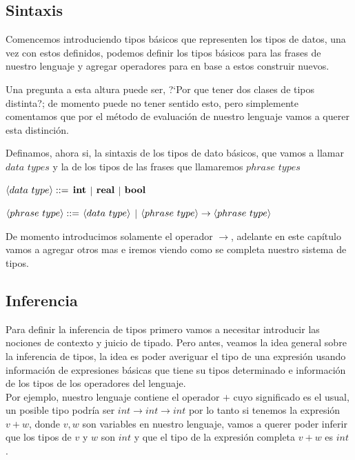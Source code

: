 \subsection{Sintaxis}
Comencemos introduciendo tipos b\'asicos que representen los tipos de datos,
una vez con estos definidos, podemos definir los tipos b\'asicos para las
frases de nuestro lenguaje y agregar operadores para en base a estos
construir nuevos.\

Una pregunta a esta altura puede ser, ?`Por que tener dos clases de tipos 
distinta?; de momento puede no tener sentido esto, pero simplemente
comentamos que por el m\'etodo de evaluaci\'on de nuestro lenguaje
vamos a querer esta distinci\'on.\

Definamos, ahora si, la sintaxis de los tipos de dato b\'asicos, 
que vamos a llamar $data$ $types$ y la de los tipos de las frases que
llamaremos $phrase$ $types$ 

\begin{center} $\langle data \ type \rangle ::=$ $\textbf{int}$ $|$ $\textbf{real}$ $|$ $\textbf{bool}$ \end{center}

\begin{center} 
$\langle phrase \ type \rangle::=$ $\langle data \ type \rangle$ 
$|$ $\langle phrase \ type \rangle \rightarrow \langle phrase \ type \rangle$
\end{center}

De momento introducimos solamente el operador $\rightarrow$, adelante en este 
cap\'itulo vamos a agregar otros mas e iremos viendo como se completa nuestro
sistema de tipos.\

\subsection{Inferencia}
Para definir la inferencia de tipos primero vamos a necesitar introducir las 
nociones de contexto y juicio de tipado. Pero antes, veamos la idea general
sobre la inferencia de tipos, la idea es poder averiguar el tipo de una expresi\'on
usando informaci\'on de expresiones b\'asicas que tiene su tipos determinado e
informaci\'on de los tipos de los operadores del lenguaje.\\
Por ejemplo, nuestro lenguaje contiene el operador $+$ cuyo significado
es el usual, un posible tipo podr\'ia ser $int \rightarrow int \rightarrow int$
por lo tanto si tenemos la expresi\'on $v + w$, donde $v,w$ son variables en
nuestro lenguaje, vamos a querer poder inferir que los tipos de $v$ y $w$ son
$int$ y que el tipo de la expresi\'on completa $v + w$ es $int$.\

